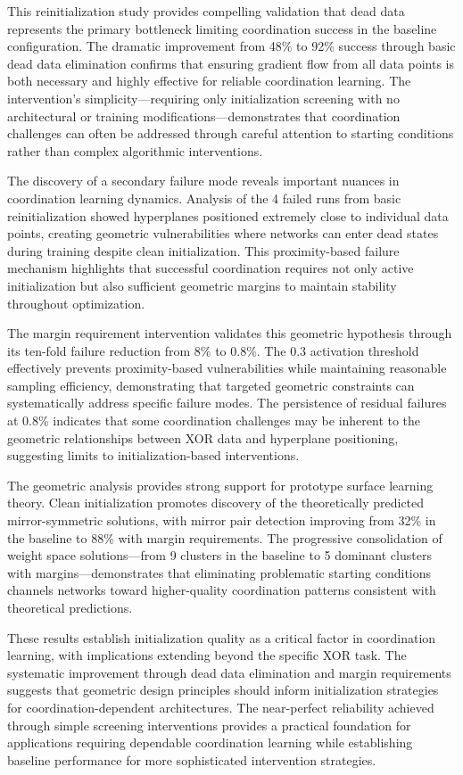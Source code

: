 This reinitialization study provides compelling validation that dead data represents the primary bottleneck limiting coordination success in the baseline configuration. The dramatic improvement from 48\% to 92\% success through basic dead data elimination confirms that ensuring gradient flow from all data points is both necessary and highly effective for reliable coordination learning. The intervention's simplicity—requiring only initialization screening with no architectural or training modifications—demonstrates that coordination challenges can often be addressed through careful attention to starting conditions rather than complex algorithmic interventions.

The discovery of a secondary failure mode reveals important nuances in coordination learning dynamics. Analysis of the 4 failed runs from basic reinitialization showed hyperplanes positioned extremely close to individual data points, creating geometric vulnerabilities where networks can enter dead states during training despite clean initialization. This proximity-based failure mechanism highlights that successful coordination requires not only active initialization but also sufficient geometric margins to maintain stability throughout optimization.

The margin requirement intervention validates this geometric hypothesis through its ten-fold failure reduction from 8\% to 0.8\%. The 0.3 activation threshold effectively prevents proximity-based vulnerabilities while maintaining reasonable sampling efficiency, demonstrating that targeted geometric constraints can systematically address specific failure modes. The persistence of residual failures at 0.8\% indicates that some coordination challenges may be inherent to the geometric relationships between XOR data and hyperplane positioning, suggesting limits to initialization-based interventions.

The geometric analysis provides strong support for prototype surface learning theory. Clean initialization promotes discovery of the theoretically predicted mirror-symmetric solutions, with mirror pair detection improving from 32\% in the baseline to 88\% with margin requirements. The progressive consolidation of weight space solutions—from 9 clusters in the baseline to 5 dominant clusters with margins—demonstrates that eliminating problematic starting conditions channels networks toward higher-quality coordination patterns consistent with theoretical predictions.

These results establish initialization quality as a critical factor in coordination learning, with implications extending beyond the specific XOR task. The systematic improvement through dead data elimination and margin requirements suggests that geometric design principles should inform initialization strategies for coordination-dependent architectures. The near-perfect reliability achieved through simple screening interventions provides a practical foundation for applications requiring dependable coordination learning while establishing baseline performance for more sophisticated intervention strategies.







